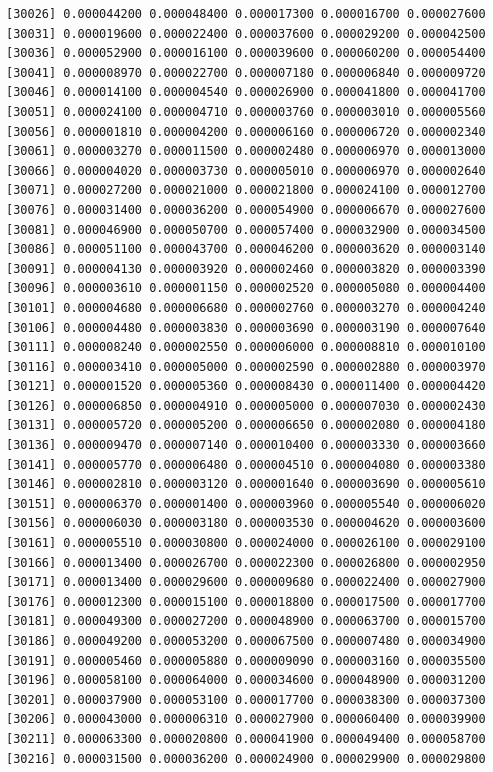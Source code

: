 \documentclass[]{article}
\begin{document}
\begin{verbatim}
[30026] 0.000044200 0.000048400 0.000017300 0.000016700 0.000027600
[30031] 0.000019600 0.000022400 0.000037600 0.000029200 0.000042500
[30036] 0.000052900 0.000016100 0.000039600 0.000060200 0.000054400
[30041] 0.000008970 0.000022700 0.000007180 0.000006840 0.000009720
[30046] 0.000014100 0.000004540 0.000026900 0.000041800 0.000041700
[30051] 0.000024100 0.000004710 0.000003760 0.000003010 0.000005560
[30056] 0.000001810 0.000004200 0.000006160 0.000006720 0.000002340
[30061] 0.000003270 0.000011500 0.000002480 0.000006970 0.000013000
[30066] 0.000004020 0.000003730 0.000005010 0.000006970 0.000002640
[30071] 0.000027200 0.000021000 0.000021800 0.000024100 0.000012700
[30076] 0.000031400 0.000036200 0.000054900 0.000006670 0.000027600
[30081] 0.000046900 0.000050700 0.000057400 0.000032900 0.000034500
[30086] 0.000051100 0.000043700 0.000046200 0.000003620 0.000003140
[30091] 0.000004130 0.000003920 0.000002460 0.000003820 0.000003390
[30096] 0.000003610 0.000001150 0.000002520 0.000005080 0.000004400
[30101] 0.000004680 0.000006680 0.000002760 0.000003270 0.000004240
[30106] 0.000004480 0.000003830 0.000003690 0.000003190 0.000007640
[30111] 0.000008240 0.000002550 0.000006000 0.000008810 0.000010100
[30116] 0.000003410 0.000005000 0.000002590 0.000002880 0.000003970
[30121] 0.000001520 0.000005360 0.000008430 0.000011400 0.000004420
[30126] 0.000006850 0.000004910 0.000005000 0.000007030 0.000002430
[30131] 0.000005720 0.000005200 0.000006650 0.000002080 0.000004180
[30136] 0.000009470 0.000007140 0.000010400 0.000003330 0.000003660
[30141] 0.000005770 0.000006480 0.000004510 0.000004080 0.000003380
[30146] 0.000002810 0.000003120 0.000001640 0.000003690 0.000005610
[30151] 0.000006370 0.000001400 0.000003960 0.000005540 0.000006020
[30156] 0.000006030 0.000003180 0.000003530 0.000004620 0.000003600
[30161] 0.000005510 0.000030800 0.000024000 0.000026100 0.000029100
[30166] 0.000013400 0.000026700 0.000022300 0.000026800 0.000002950
[30171] 0.000013400 0.000029600 0.000009680 0.000022400 0.000027900
[30176] 0.000012300 0.000015100 0.000018800 0.000017500 0.000017700
[30181] 0.000049300 0.000027200 0.000048900 0.000063700 0.000015700
[30186] 0.000049200 0.000053200 0.000067500 0.000007480 0.000034900
[30191] 0.000005460 0.000005880 0.000009090 0.000003160 0.000035500
[30196] 0.000058100 0.000064000 0.000034600 0.000048900 0.000031200
[30201] 0.000037900 0.000053100 0.000017700 0.000038300 0.000037300
[30206] 0.000043000 0.000006310 0.000027900 0.000060400 0.000039900
[30211] 0.000063300 0.000020800 0.000041900 0.000049400 0.000058700
[30216] 0.000031500 0.000036200 0.000024900 0.000029900 0.000029800

\end{verbatim}
\end{document}
